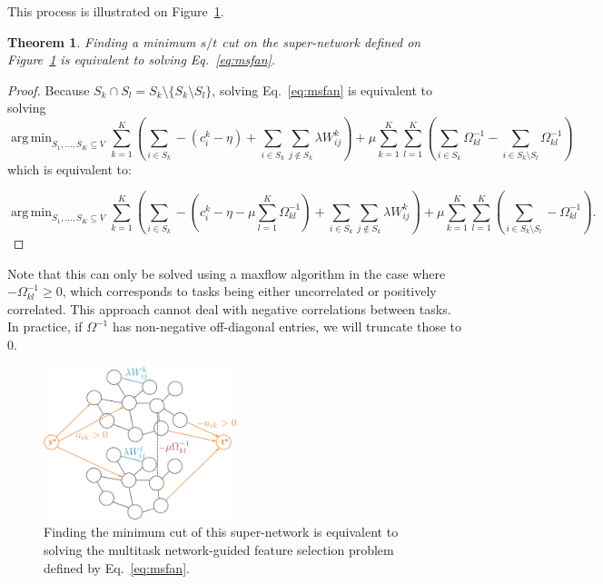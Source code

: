 \documentclass[12pt,a4paper]{article}
\newtheorem{thm}{Theorem}
\newcommand{\sset}{S}
\newcommand{\vset}{V}
\DeclareMathOperator*{\argmin}{arg\,min}
\begin{document}
This process is illustrated on Figure~\ref{fig:mincut_msfan}.\\

\begin{thm}
  Finding a minimum $s/t$ cut on the super-network defined on Figure~\ref{fig:mincut_msfan} is equivalent to solving Eq.~\ref{eq:msfan}.
\end{thm}


\begin{proof}
  Because $\sset_k \cap \sset_l = \sset_k \setminus \{\sset_k \setminus \sset_l
  \}$, solving Eq.~\ref{eq:msfan} is equivalent to solving
  \[
  \argmin_{\sset_1, \ldots, \sset_K \subseteq \vset} \sum_{k=1}^K \left(
    \sum_{i \in \sset_k} - (c_i^k - \eta) + \sum_{i \in \sset_k} \sum_{j \notin
      \sset_k} \lambda W_{ij}^k \right) + \mu \sum_{k=1}^K \sum_{l=1}^K \left(
    \sum_{i \in \sset_k} \Omega_{kl}^{-1} - \sum_{i \in \sset_k \setminus
      \sset_l} \Omega_{kl}^{-1} \right)
  \]
  which is equivalent to:

  \begin{equation}
  \argmin_{\sset_1, \ldots, \sset_K \subseteq \vset} \sum_{k=1}^K \left(
    \sum_{i \in \sset_k} - \left(c_i^k - \eta - \mu \sum_{l=1}^K \Omega_{kl}^{-1} \right) + 
    \sum_{i \in \sset_k} \sum_{j \notin \sset_k} \lambda W_{ij}^k \right) + 
  \mu \sum_{k=1}^K \sum_{l=1}^K \left( \sum_{i \in \sset_k \setminus \sset_l} - \Omega_{kl}^{-1} \right).
  \label{eq:msfan_mineq}
\end{equation}
\end{proof}

Note that this can only be solved using a maxflow algorithm in the case where $- \Omega_{kl}^{-1} \geq 0$, 
which corresponds to tasks being either uncorrelated or positively correlated. 
This approach cannot deal with negative correlations between tasks.
In practice, if $\Omega^{-1}$ has non-negative off-diagonal entries, we will truncate those to $0$.

\begin{figure}[h]
  \centering
  \includegraphics[width=0.5\textwidth]{figures/mincut_msfan}
  \caption{Finding the minimum cut of this super-network is equivalent to solving the multitask network-guided feature selection problem defined by Eq.~\ref{eq:msfan}.}
  \label{fig:mincut_msfan}
\end{figure}
\end{document}

